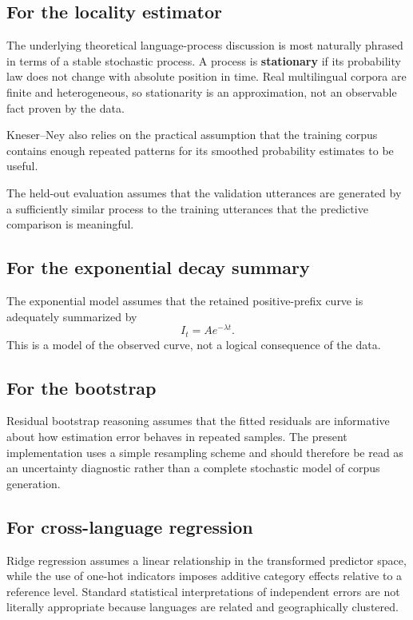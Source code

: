 \documentclass[11pt]{article}
\begin{document}
\subsection{For the locality estimator}
The underlying theoretical language-process discussion is most naturally phrased in terms of a stable stochastic process. A process is \textbf{stationary} if its probability law does not change with absolute position in time. Real multilingual corpora are finite and heterogeneous, so stationarity is an approximation, not an observable fact proven by the data.

Kneser--Ney also relies on the practical assumption that the training corpus contains enough repeated patterns for its smoothed probability estimates to be useful.

The held-out evaluation assumes that the validation utterances are generated by a sufficiently similar process to the training utterances that the predictive comparison is meaningful.

\subsection{For the exponential decay summary}
The exponential model assumes that the retained positive-prefix curve is adequately summarized by
\[
I_t=Ae^{-\lambda t}.
\]
This is a model of the observed curve, not a logical consequence of the data.

\subsection{For the bootstrap}
Residual bootstrap reasoning assumes that the fitted residuals are informative about how estimation error behaves in repeated samples. The present implementation uses a simple resampling scheme and should therefore be read as an uncertainty diagnostic rather than a complete stochastic model of corpus generation.

\subsection{For cross-language regression}
Ridge regression assumes a linear relationship in the transformed predictor space, while the use of one-hot indicators imposes additive category effects relative to a reference level. Standard statistical interpretations of independent errors are not literally appropriate because languages are related and geographically clustered.
\end{document}
